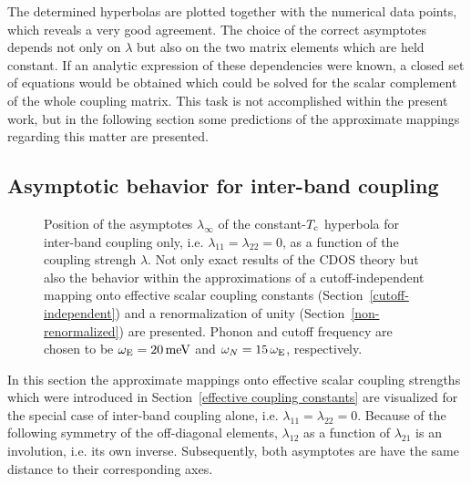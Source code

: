 The determined hyperbolas are plotted together with the numerical data points,
which reveals a very good agreement. The choice of the correct asymptotes
depends not only on $\lambda$ but also on the two matrix elements which are held
constant. If an analytic expression of these dependencies were known, a closed
set of equations would be obtained which could be solved for the scalar
complement of the whole coupling matrix. This task is not accomplished within
the present work, but in the following section some predictions of the
approximate mappings regarding this matter are presented.

\subsection{Asymptotic behavior for inter-band coupling}

\begin{figure}
    \small
    
    
    \caption[Asymptotes of inter-band hyperbola of constant $T \sub c$]{
        Position of the asymptotes $\lambda_\infty$ of the constant-$T \sub c$
        hyperbola for inter-band coupling only, i.e. $\lambda_{1 1} = \lambda_{2
        2} = 0$, as a function of the coupling strengh $\lambda$. Not only exact
        results of the CDOS  theory but also the behavior
        within the approximations of a cutoff-independent mapping onto effective
        scalar coupling constants (Section~\ref{cutoff-independent}) and a
        renormalization of unity (Section~\ref{non-renormalized}) are presented.
        Phonon and cutoff frequency are chosen to be $\omega \sb{\text{E}} = 20 \,
        \mathrm{meV}$ and $\omega_N = 15 \, \omega \sb{\text{E}}$, respectively.}
    \label{inter-band hyperbola of constant Tc}
\end{figure}
%
In this section the approximate mappings onto effective scalar coupling
strengths which were introduced in Section~\ref{effective coupling constants}
are visualized for the special case of inter-band coupling alone, i.e.
$\lambda_{1 1} = \lambda_{2 2} = 0$. Because of the following symmetry of the
off-diagonal elements, $\lambda_{1 2}$ as a function of $\lambda_{2 1}$ is an
involution, i.e. its own inverse. Subsequently, both asymptotes are have the
same distance to their corresponding axes.

